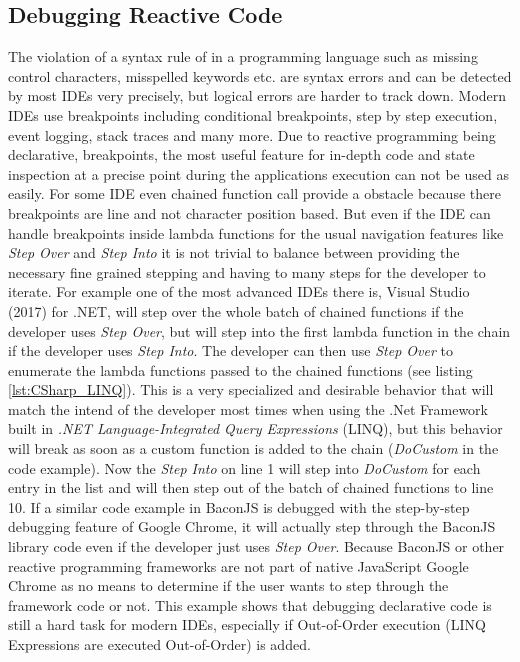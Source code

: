 \subsection{Debugging Reactive Code}
The violation of a syntax rule of in a programming language such as missing control characters, misspelled keywords etc. are syntax errors and can be detected by most IDEs very precisely, but logical errors are harder to track down. Modern IDEs use breakpoints including conditional breakpoints, step by step execution, event logging, stack traces and many more. Due to reactive programming being declarative, breakpoints, the most useful feature for in-depth code and state inspection at a precise point during the applications execution can not be used as easily. For some IDE even chained function call provide a obstacle because there breakpoints are line and not character position based. But even if the IDE can handle breakpoints inside lambda functions for the usual navigation features like \emph{Step Over} and \emph{Step Into} it is not trivial to balance between providing the necessary fine grained stepping and having to many steps for the developer to iterate. For example one of the most advanced IDEs there is, Visual Studio (2017) for .NET, will step over the whole batch of chained functions if the developer uses \emph{Step Over}, but will step into the first lambda function in the chain if the developer uses \emph{Step Into}. The developer can then use \emph{Step Over} to enumerate the lambda functions passed to the chained functions (see listing \ref{lst:CSharp_LINQ}). This is a very specialized and desirable behavior that will match the intend of the developer most times when using the .Net Framework built in \emph{.NET Language-Integrated Query Expressions} (LINQ), but this behavior will break as soon as a custom function is added to the chain (\emph{DoCustom} in the code example). Now the \emph{Step Into} on line 1 will step into \emph{DoCustom} for each entry in the list and will then step out of the batch of chained functions to line 10. If a similar code example in BaconJS is debugged with the step-by-step debugging feature of Google Chrome, it will actually step through the BaconJS library code even if the developer just uses \emph{Step Over}. Because BaconJS or other reactive programming frameworks are not part of native JavaScript Google Chrome as no means to determine if the user wants to step through the framework code or not.
This example shows that debugging declarative code is still a hard task for modern IDEs, especially if Out-of-Order execution (LINQ Expressions are executed Out-of-Order) is added.
